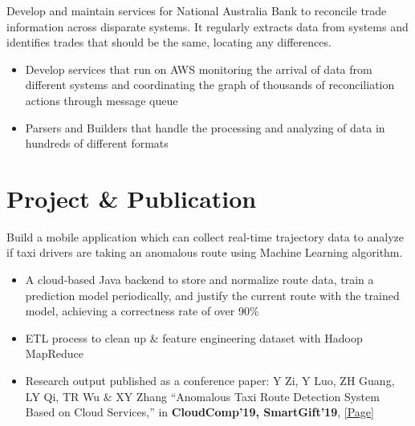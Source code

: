 \documentclass{resume}
\begin{document}
\begin{flushleft}
Develop and maintain services for National Australia Bank to reconcile trade information across disparate systems. It regularly extracts data from systems and identifies trades that should be the same, locating any differences.
\begin{itemize}
  \item Develop services that run on AWS monitoring the arrival of data from different systems and coordinating the graph of thousands of reconciliation actions through message queue
  \item Parsers and Builders that handle the processing and analyzing of data in hundreds of different formats
\end{itemize}
\end{flushleft}

\section{Project \& Publication}
\begin{flushleft}
Build a mobile application which can collect real-time trajectory data to analyze if taxi drivers are taking an anomalous route using Machine Learning algorithm.
\begin{itemize}
    \item A cloud-based Java backend to store and normalize route data, train a prediction model periodically, \linebreak and justify the current route with the trained model, achieving a correctness rate of over 90\%
    \item ETL process to clean up \& feature engineering dataset with Hadoop MapReduce
    \item Research output published as a conference paper: Y Zi, Y Luo, ZH Guang, LY Qi, TR Wu \& XY Zhang ``Anomalous Taxi Route Detection System Based on Cloud Services,'' in \textbf{CloudComp'19, SmartGift'19}, \href{https://link.springer.com/chapter/10.1007/978-3-030-48513-9_20}{[Page]}
\end{itemize}
\end{flushleft}
\end{document}
